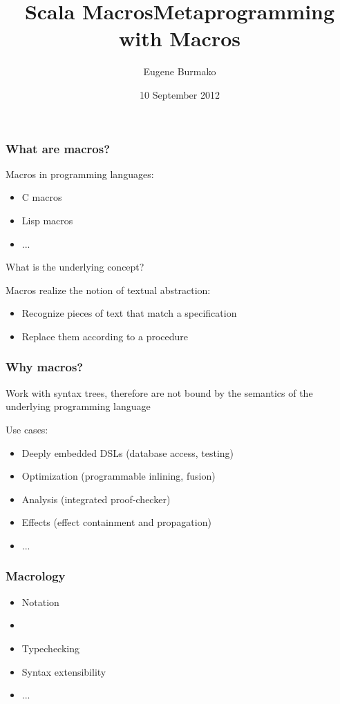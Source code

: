 \documentclass[hyperref={bookmarks=false}]{beamer}
\title{Scala Macros}
\begin{document}
\title{Metaprogramming with Macros}
\author{Eugene Burmako}
\date{10 September 2012}
{
\begin{frame}
  \titlepage
\end{frame}
}

\begin{frame}[fragile]
\frametitle{What are macros?}
Macros in programming languages:
\begin{itemize}
\item C macros
\item Lisp macros
\item ...
\end{itemize}

\vskip25pt
What is the underlying concept?
\vskip25pt
\pause

Macros realize the notion of textual abstraction:
\begin{itemize}
\item Recognize pieces of text that match a specification
\item Replace them according to a procedure
\end{itemize}
\end{frame}

\begin{frame}[fragile]
\frametitle{Why macros?}

Work with syntax trees, therefore are not bound by the semantics of the underlying
programming language

Use cases:
\begin{itemize}
\item Deeply embedded DSLs (database access, testing)
\item Optimization (programmable inlining, fusion)
\item Analysis (integrated proof-checker)
\item Effects (effect containment and propagation)
\item ...
\end{itemize}
\end{frame}

\begin{frame}[fragile]
\frametitle{Macrology}
\begin{itemize}
\item Notation
\item \text{\color{blue}{Variable capture}}
\item Typechecking
\item Syntax extensibility
\item ...
\end{itemize}
\end{frame}
\end{document}
